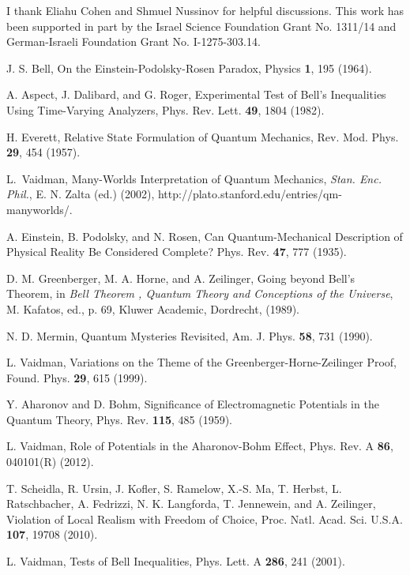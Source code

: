 \documentclass[11pt]{article}
\begin{document}
I thank Eliahu Cohen  and Shmuel Nussinov for helpful discussions. This work has been supported in part by   the Israel Science Foundation  Grant No. 1311/14  and German-Israeli Foundation  Grant No. I-1275-303.14.

\small
\begin{thebibliography}{99}


J. S. Bell,
On the Einstein-Podolsky-Rosen Paradox,
 Physics {\bf 1}, 195 (1964).

A. Aspect, J. Dalibard, and G. Roger,
Experimental Test of Bell's Inequalities Using Time-Varying Analyzers,
Phys. Rev. Lett. {\bf 49}, 1804 (1982).

 H. Everett,
 Relative State Formulation of Quantum Mechanics,
  Rev.  Mod. Phys.  {\bf 29}, 454 (1957).


 L.~Vaidman,
  Many-Worlds Interpretation of Quantum
Mechanics, {\it Stan. Enc. Phil.},  E. N. Zalta (ed.) (2002),
http://plato.stanford.edu/entries/qm-manyworlds/.


A. Einstein, B. Podolsky, and N. Rosen,
Can Quantum-Mechanical Description of Physical Reality Be Considered Complete?
Phys. Rev. {\bf 47}, 777 (1935).


D. M. Greenberger, M. A. Horne, and A. Zeilinger,
Going beyond Bell's Theorem,
 in {\it Bell Theorem , Quantum Theory and Conceptions of the Universe}, M. Kafatos, ed., p. 69, Kluwer Academic, Dordrecht, (1989).

N. D. Mermin,
 Quantum Mysteries Revisited,
 Am. J. Phys. {\bf 58}, 731 (1990).

L. Vaidman,
Variations on the Theme of the Greenberger-Horne-Zeilinger Proof,
Found. Phys. {\bf 29}, 615  (1999).


Y. Aharonov and D. Bohm,
Significance of Electromagnetic Potentials in the Quantum Theory,
Phys. Rev. {\bf 115}, 485 (1959).


L. Vaidman,
Role of Potentials in the Aharonov-Bohm Effect,
Phys. Rev. A {\bf 86}, 040101(R) (2012).


T. Scheidla, R. Ursin, J. Kofler, S. Ramelow, X.-S. Ma, T. Herbst, L. Ratschbacher, A. Fedrizzi, N. K. Langforda, T. Jennewein, and A. Zeilinger,
Violation of Local Realism with Freedom of Choice,
 Proc. Natl. Acad. Sci. U.S.A. {\bf 107}, 19708 (2010).

L. Vaidman,
Tests of Bell Inequalities,
Phys. Lett. A  {\bf 286}, 241 (2001).



\end{thebibliography}
\end{document}
